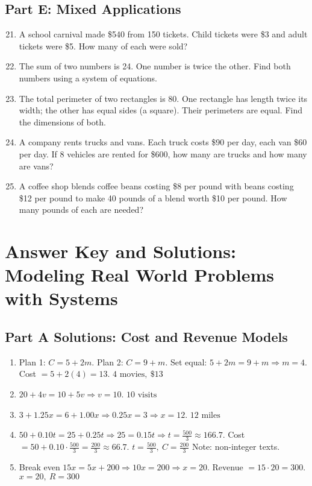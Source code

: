 \documentclass[12pt]{article}
\begin{document}
\subsection*{Part E: Mixed Applications}
\begin{enumerate}
  \setcounter{enumi}{20}
  \item A school carnival made \$540 from 150 tickets. Child tickets were \$3 and adult tickets were \$5. How many of each were sold?
  \item The sum of two numbers is 24. One number is twice the other. Find both numbers using a system of equations.
  \item The total perimeter of two rectangles is 80. One rectangle has length twice its width; the other has equal sides (a square). Their perimeters are equal. Find the dimensions of both.
  \item A company rents trucks and vans. Each truck costs \$90 per day, each van \$60 per day. If 8 vehicles are rented for \$600, how many are trucks and how many are vans?
  \item A coffee shop blends coffee beans costing \$8 per pound with beans costing \$12 per pound to make 40 pounds of a blend worth \$10 per pound. How many pounds of each are needed?
\end{enumerate}

\newpage


\section*{Answer Key and Solutions: Modeling Real World Problems with Systems}

\subsection*{Part A Solutions: Cost and Revenue Models}
\begin{enumerate}
  \item Plan 1: \(C=5+2m\). Plan 2: \(C=9+m\).  
  Set equal: \(5+2m=9+m \Rightarrow m=4\). Cost \(=5+2(4)=13\). \(\boxed{4\text{ movies},\ \$13}\)

  \item \(20+4v=10+5v \Rightarrow v=10\). \(\boxed{10\text{ visits}}\)

  \item \(3+1.25x=6+1.00x \Rightarrow 0.25x=3 \Rightarrow x=12\). \(\boxed{12\text{ miles}}\)

  \item \(50+0.10t=25+0.25t \Rightarrow 25=0.15t \Rightarrow t=\frac{500}{3}\approx166.7\).  
  Cost \(=50+0.10\cdot\frac{500}{3}=\frac{200}{3}\approx66.7\). \(\boxed{t=\frac{500}{3},\ C=\frac{200}{3}}\)  
  Note: non-integer texts.

  \item Break even \(15x=5x+200 \Rightarrow 10x=200 \Rightarrow x=20\). Revenue \(=15\cdot20=300\). \(\boxed{x=20,\ R=300}\)
\end{enumerate}
\end{document}
